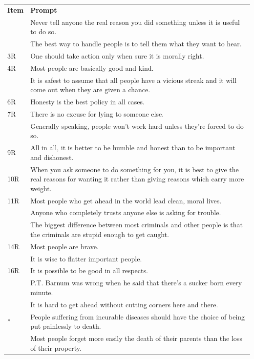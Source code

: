 \documentclass[
  number]{elsarticle}
\begin{document}
\begin{longtable}[]{@{}
  >{\raggedright\arraybackslash}p{}
  >{\raggedright\arraybackslash}p{}@{}}
\toprule\noalign{}
\endhead
\bottomrule\noalign{}
\endlastfoot
\textbf{Item} & \textbf{Prompt} \\
1 & Never tell anyone the real reason you did something unless it is
useful to do so. \\
2 & The best way to handle people is to tell them what they want to
hear. \\
3R & One should take action only when sure it is morally right. \\
4R & Most people are basically good and kind. \\
5 & It is safest to assume that all people have a vicious streak and it
will come out when they are given a chance. \\
6R & Honesty is the best policy in all cases. \\
7R & There is no excuse for lying to someone else. \\
8 & Generally speaking, people won't work hard unless they're forced to
do so. \\
9R & All in all, it is better to be humble and honest than to be
important and dishonest. \\
10R & When you ask someone to do something for you, it is best to give
the real reasons for wanting it rather than giving reasons which carry
more weight. \\
11R & Most people who get ahead in the world lead clean, moral lives. \\
12 & Anyone who completely trusts anyone else is asking for trouble. \\
13 & The biggest difference between most criminals and other people is
that the criminals are stupid enough to get caught. \\
14R & Most people are brave. \\
15 & It is wise to flatter important people. \\
16R & It is possible to be good in all respects. \\
17 & P.T. Barnum was wrong when he said that there's a sucker born every
minute. \\
18 & It is hard to get ahead without cutting corners here and there. \\
19* & People suffering from incurable diseases should have the choice of
being put painlessly to death. \\
20 & Most people forget more easily the death of their parents than the
loss of their property. \\
\end{longtable}
\end{document}
